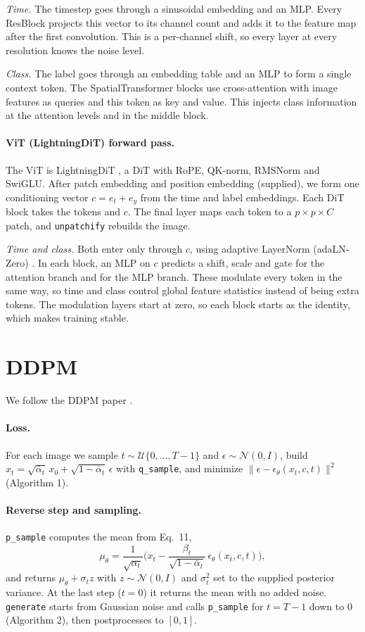 \documentclass[11pt]{article}
\begin{document}
\emph{Time.} The timestep goes through a sinusoidal embedding and an MLP. Every ResBlock projects this vector to its channel count and adds it to the feature map after the first convolution. This is a per-channel shift, so every layer at every resolution knows the noise level.

\emph{Class.} The label goes through an embedding table and an MLP to form a single context token. The SpatialTransformer blocks use cross-attention with image features as queries and this token as key and value. This injects class information at the attention levels and in the middle block.

\paragraph{ViT (LightningDiT) forward pass.} The ViT \cite{dosovitskiy2021vit} is LightningDiT \cite{yao2025lightningdit}, a DiT \cite{peebles2023dit} with RoPE, QK-norm, RMSNorm and SwiGLU. After patch embedding and position embedding (supplied), we form one conditioning vector $c = e_t + e_y$ from the time and label embeddings. Each DiT block takes the tokens and $c$. The final layer maps each token to a $p\times p\times C$ patch, and \texttt{unpatchify} rebuilds the image.

\emph{Time and class.} Both enter only through $c$, using adaptive LayerNorm (adaLN-Zero) \cite{peebles2023dit}. In each block, an MLP on $c$ predicts a shift, scale and gate for the attention branch and for the MLP branch. These modulate every token in the same way, so time and class control global feature statistics instead of being extra tokens. The modulation layers start at zero, so each block starts as the identity, which makes training stable.

\section{DDPM}
We follow the DDPM paper \cite{ho2020ddpm}.
\paragraph{Loss.} For each image we sample $t \sim \mathcal{U}\{0,\dots,T-1\}$ and $\epsilon \sim \mathcal{N}(0,I)$, build $x_t = \sqrt{\bar\alpha_t}\,x_0 + \sqrt{1-\bar\alpha_t}\,\epsilon$ with \texttt{q\_sample}, and minimize $\|\epsilon - \epsilon_\theta(x_t, c, t)\|^2$ (Algorithm 1).

\paragraph{Reverse step and sampling.} \texttt{p\_sample} computes the mean from Eq.~11,
\[
\mu_\theta = \frac{1}{\sqrt{\alpha_t}}\Big(x_t - \frac{\beta_t}{\sqrt{1-\bar\alpha_t}}\,\epsilon_\theta(x_t,c,t)\Big),
\]
and returns $\mu_\theta + \sigma_t z$ with $z\sim\mathcal{N}(0,I)$ and $\sigma_t^2$ set to the supplied posterior variance. At the last step ($t=0$) it returns the mean with no added noise. \texttt{generate} starts from Gaussian noise and calls \texttt{p\_sample} for $t = T-1$ down to $0$ (Algorithm 2), then postprocesses to $[0,1]$.
\end{document}

